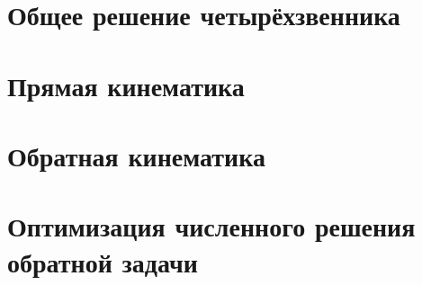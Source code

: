 \section{Общее решение четырёхзвенника}


\section{Прямая кинематика}


\section{Обратная кинематика}


\section{Оптимизация численного решения обратной задачи}